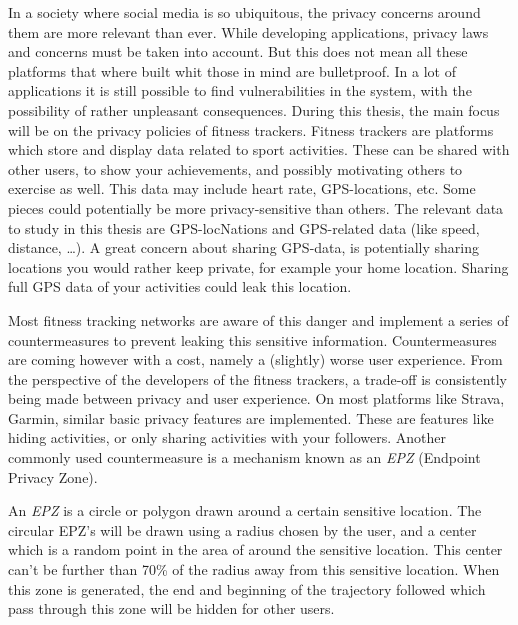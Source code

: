 In a society where social media is so ubiquitous, the privacy concerns around
them are more relevant than ever. While developing applications, privacy laws
and concerns must be taken into account. But this does not mean all these
platforms that where built whit those in mind are bulletproof. In a lot of
applications it is still possible to find vulnerabilities in the system, with
the possibility of rather unpleasant consequences. During this thesis, the main
focus will be on the privacy policies of fitness trackers. Fitness trackers are
platforms which store and display data related to sport activities. These can
be shared with other users, to show your achievements, and possibly motivating
others to exercise as well. This data may include heart rate, GPS-locations,
etc. Some pieces could potentially be more privacy-sensitive than others. The
relevant data to study in this thesis are GPS-locNations and GPS-related data
(like speed, distance, \ldots). A great concern about sharing GPS-data, is
potentially sharing locations you would rather keep private, for example your
home location. Sharing full GPS data of your activities could leak this
location.

Most fitness tracking networks are aware of this danger and implement a series
of countermeasures to prevent leaking this sensitive information.
Countermeasures are coming however with a cost, namely a (slightly) worse user
experience. From the perspective of the developers of the fitness trackers, a
trade-off is consistently being made between privacy and user experience. On
most platforms like Strava, Garmin, similar basic privacy features are
implemented. These are features like hiding activities, or only sharing
activities with your followers. Another commonly used countermeasure is a
mechanism known as an \textit{EPZ} (Endpoint Privacy Zone).

An \textit{EPZ} is a circle or polygon drawn around a certain sensitive
location. The circular EPZ's will be drawn using a radius chosen by the user,
and a center which is a random point in the area of around the sensitive
location. This center can't be further than 70\% of the radius away from this
sensitive location. When this zone is generated, the end and beginning of the
trajectory followed which pass through this zone will be hidden for other
users.

